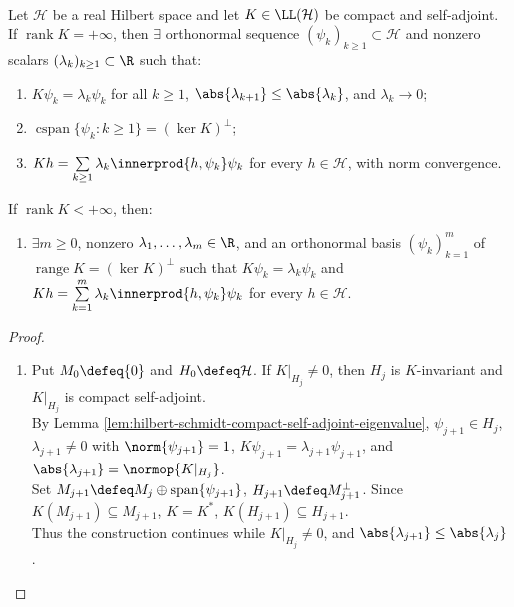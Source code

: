 \begin{theorem} \label{thm:hilbert-schmidt-compact-self-adjoint-spectral-theorem} \\
Let $\mathcal{H}$ be a real Hilbert space and let $K\in\LL(\mathcal{H})$ be compact and self-adjoint.\\
If $\operatorname{rank}K=+\infty$, then $\exists$ orthonormal sequence $(\psi_k)_{k\geq1}\subset\mathcal H$ and nonzero scalars $(\lambda_k)_{k\geq1}\subset\R$ such that:
\begin{enumerate}[label=(\roman*)]
\setlength{\itemsep}{0pt}
\item $K\psi_k=\lambda_k\psi_k$ for all $k\geq1$, $\abs{\lambda_{k+1}}\leq\abs{\lambda_k}$, and $\lambda_k\to0$;
\item $\operatorname{cspan}\{\psi_k:k\geq1\}=(\ker K)^\perp$;
\item $Kh=\sum\limits_{k\geq1}\lambda_k\innerprod{h,\psi_k}\psi_k$ for every $h\in\mathcal{H}$, with norm convergence.
\end{enumerate}
If $\operatorname{rank}K<+\infty$, then:
\begin{enumerate}[label=(\roman*),resume]
\setlength{\itemsep}{0pt}
\item $\exists m\geq0$, nonzero $\lambda_1,\ldots,\lambda_m\in\R$, and an orthonormal basis $(\psi_k)_{k=1}^m$ of $\operatorname{range}K=(\ker K)^\perp$ such that $K\psi_k=\lambda_k\psi_k$ and $Kh=\sum\limits_{k=1}^m\lambda_k\innerprod{h,\psi_k}\psi_k$ for every $h\in\mathcal H$.
\end{enumerate}
\begin{proof}
\begin{enumerate}[label=(\roman*)]
\setlength{\itemsep}{0pt}
 \item Put $M_0\defeq\{0\}$ and $H_0\defeq\mathcal H$. If $K|_{H_j}\neq0$, then $H_j$ is $K$-invariant and $K|_{H_j}$ is compact self-adjoint.\\
By Lemma \ref{lem:hilbert-schmidt-compact-self-adjoint-eigenvalue}, $\psi_{j+1}\in H_j$, $\lambda_{j+1}\neq0$ with $\norm{\psi_{j+1}}=1$, $K\psi_{j+1}=\lambda_{j+1}\psi_{j+1}$, and $\abs{\lambda_{j+1}}=\normop{K|_{H_j}}$.\\
Set $M_{j+1}\defeq M_j\oplus\operatorname{span}\{\psi_{j+1}\}$, $H_{j+1}\defeq M_{j+1}^{\perp}$. Since $K(M_{j+1})\subseteq M_{j+1}$, $K=K^*$, $K(H_{j+1})\subseteq H_{j+1}$.\\
Thus the construction continues while $K|_{H_j}\neq0$, and $\abs{\lambda_{j+1}}\leq\abs{\lambda_j}$.\\

\end{enumerate}
\end{proof}
\end{theorem}

